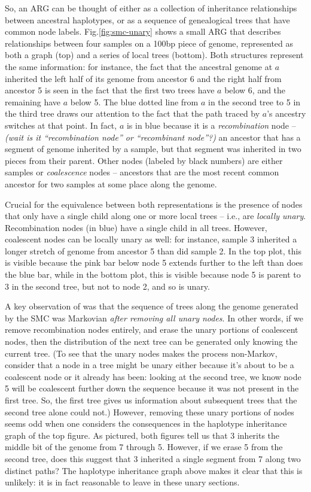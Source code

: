 \documentclass{article}
\newcommand{\comment}[1]{{\it \color{orange} (#1)}}
\begin{document}
So, an ARG can be thought of either as a collection of inheritance relationships
between ancestral haplotypes,
or as a sequence of genealogical trees that have common node labels.
Fig.\ref{fig:smc-unary} shows a small ARG
that describes relationships between four samples on a 100bp piece of genome,
represented as both a graph (top) and a series of local trees (bottom).
Both structures represent the same information:
for instance, the fact that the ancestral genome at $a$
inherited the left half of its genome from ancestor 6
and the right half from ancestor 5
is seen in the fact that the first two trees have $a$ below 6,
and the remaining have $a$ below 5.
The blue dotted line from $a$ in the second tree to 5 in the third tree
draws our attention to the fact that
the path traced by $a$'s ancestry switches at that point.
In fact, $a$ is in blue because it is a \emph{recombination} node --
\comment{wait is it ``recombination node'' or ``recombinant node''?}
an ancestor that has a segment of genome inherited by a sample,
but that segment was inherited in two pieces from their parent.
Other nodes (labeled by black numbers) are either samples
or \emph{coalescence} nodes --
ancestors that are the most recent common ancestor for two samples
at some place along the genome.

Crucial for the equivalence between both representations is the presence of
nodes that only have a single child along one or more local trees --
i.e., are \emph{locally unary}.
Recombination nodes (in blue) have a single child in all trees.
However, coalescent nodes can be locally unary as well:
for instance, sample 3 inherited a longer stretch of genome from ancestor 5
than did sample 2.
In the top plot, this is visible because the pink bar below node 5
extends further to the left than does the blue bar,
while in the bottom plot, this is visible because node 5 is parent to 3
in the second tree, but not to node 2, and so is unary.

A key observation of \citet{mcvean_approximating_2005}
was that the sequence of trees along the genome
generated by the SMC was Markovian \emph{after removing all unary nodes}.
In other words, if we remove recombination nodes entirely,
and erase the unary portions of coalescent nodes,
then the distribution of the next tree can be generated only knowing the current tree.
(To see that the unary nodes makes the process non-Markov,
consider that a node in a tree might be unary either because it's about to be a coalescent node
or it already has been:
looking at the second tree, we know node 5 will be coalescent further down the sequence
because it was not present in the first tree.
So, the first tree gives us information about subsequent trees
that the second tree alone could not.)
However, removing these unary portions of nodes seems odd
when one considers the consequences in the haplotype inheritance graph
of the top figure.
As pictured, both figures tell us that
3 inherits the middle bit of the genome from 7 through 5.
However, if we erase 5 from the second tree,
does this suggest that 3 inherited a single segment from 7 along two distinct paths?
The haplotype inheritance graph above makes it clear that this is unlikely:
it is in fact reasonable to leave in these unary sections.
\end{document}
